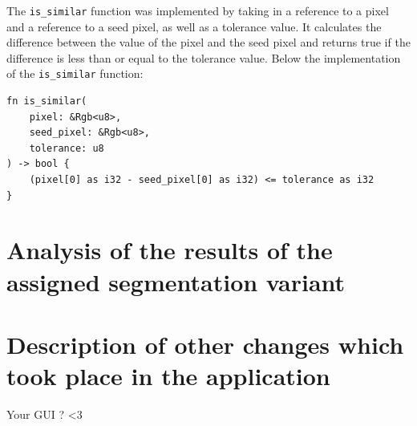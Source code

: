 \documentclass[12pt]{article}
\begin{document}
The \lstinline{is_similar} function was implemented by taking in a reference to a pixel
and a reference to a seed pixel,
as well as a tolerance value.
It calculates the difference between the value of the pixel
and the seed pixel and returns true if the difference is less than or equal
to the tolerance value. Below the implementation of the \lstinline{is_similar} function:

\begin{lstlisting}
fn is_similar(
    pixel: &Rgb<u8>, 
    seed_pixel: &Rgb<u8>, 
    tolerance: u8
) -> bool {
    (pixel[0] as i32 - seed_pixel[0] as i32) <= tolerance as i32
}
\end{lstlisting}

\section{Analysis of the results of the assigned segmentation variant}
\section{Description of other changes which took place in the application}

Your GUI ? <3
\end{document}
